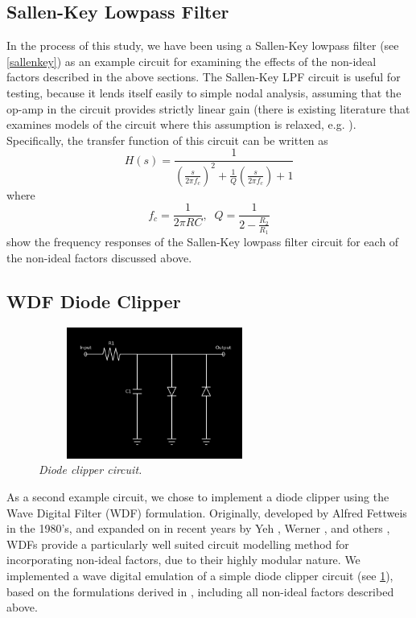 \documentclass[twoside,a4paper]{article}
\begin{document}
\subsection{Sallen-Key Lowpass Filter} \label{sec:SK-LPF}
%
In the process of this study, we have been using a Sallen-Key lowpass
filter \cite{SallenKey} (see \cref{sallenkey}) as an example circuit for
examining the effects of the non-ideal factors described in the above
sections. The Sallen-Key LPF circuit is useful for testing, because it
lends itself easily to simple nodal analysis, assuming that the op-amp
in the circuit provides strictly linear gain (there is existing
literature that examines models of the circuit where this assumption is
relaxed, e.g. \cite{SKF-DAFX}). Specifically, the transfer function of
this circuit can be written as
%
\begin{equation}
    H(s) = \frac{1}{\left(\frac{s}{2\pi f_c} \right)^2
         + \frac{1}{Q}\left(\frac{s}{2\pi f_c} \right) + 1}  
    \label{eq:SKF-transfer}
\end{equation}
%
where
%
\begin{equation}
    f_c = \frac{1}{2\pi RC}, \;\;
    Q = \frac{1}{2 - \frac{R_2}{R_1}}
    \label{eq:SKF-params}
\end{equation}
%
 show the
frequency responses of the Sallen-Key lowpass filter circuit for
each of the non-ideal factors discussed above.

\subsection{WDF Diode Clipper} \label{sec:WDF}
%
\begin{figure}[h]
    \center
    \includegraphics[width=3in,height=1.7in]{Pics/diodeclipper.png}
    \caption{\label{diodeclipper}{\it Diode clipper circuit.}}
\end{figure}
%
As a second example circuit, we chose to implement a diode clipper using
the Wave Digital Filter (WDF) formulation. Originally, developed by
Alfred Fettweis \cite{Fettweis} in the 1980's, and expanded on in recent
years by Yeh \cite{YehWDF}, Werner \cite{KurtThesis}, and others
\cite{JJWDF,WDF2}, WDFs provide a particularly well suited circuit
modelling method for incorporating non-ideal factors, due to their highly
modular nature. We implemented a wave digital emulation of a simple diode
clipper circuit (see \cref{diodeclipper}), based on the formulations
derived in \cite{YehDiode,KurtDiode}, including all non-ideal factors
described above.
\end{document}
